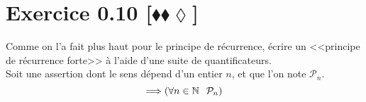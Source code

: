\documentclass[10pt]{article}
\begin{document}
\section*{Exercice 0.10 [$\blacklozenge\blacklozenge\lozenge$]}
\begin{tcolorbox}[enhanced, width=7in, center, size=fbox, fontupper=\large, drop shadow southwest]
    Comme on l'a fait plus haut pour le principe de récurrence, écrire un <<principe de récurrence forte>> à l'aide d'une suite de quantificateurs.\\
    Soit une assertion dont le sens dépend d'un entier $n$, et que l'on note $\mathcal{P}_n$.
    \begin{equation*}
        [\forall{n\in\mathbb{N} \hspace{0.25cm}}(\forall{k\in[0, n] \hspace{0.25cm} \mathcal{P}_k}) \Rightarrow \mathcal{P}_{n+1}] \Longrightarrow (\forall{n\in\mathbb{N}} \hspace{0.25cm} \mathcal{P}_n)
    \end{equation*}
\end{tcolorbox}
\end{document}
